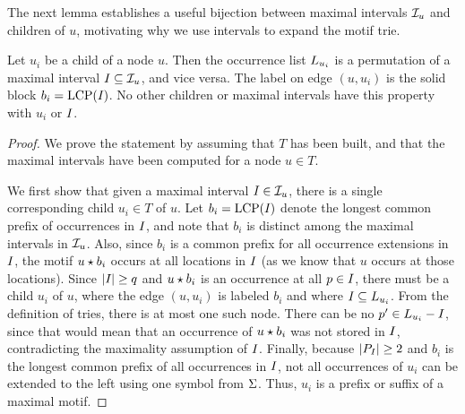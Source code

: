 The next lemma establishes a useful bijection between maximal intervals $\mathcal{I}_{u}$ and children of $u$, motivating why we use intervals to expand the motif trie. 
\begin{lemma}
  \label{lem:bijection}
    Let $u_i$ be a child of a node $u$. Then the occurrence list $L_{u_i}$ is a permutation of a maximal interval $I_{} \subseteq \mathcal{I}_{u}$, and vice versa. The label on edge $(u, u_i)$ is the solid block $b_i = \operatorname{LCP}(I_{})$. No other children or maximal intervals have this property with $u_i$ or $I_{}$.
\end{lemma}
\begin{proof}
    We prove the statement by assuming that $T$ has been built, and that the maximal intervals have been computed for a node $u \in T$.

    We first show that given a maximal interval $I_{} \in \mathcal{I}_{u}$, there is a single corresponding child $u_i \in T$ of $u$.
    Let $b_i = \operatorname{LCP}(I_{})$ denote the longest common prefix of occurrences in $I_{}$, and note that $b_i$ is distinct among the maximal intervals in $\mathcal{I}_{u}$. Also, since $b_i$ is a common prefix for all occurrence extensions in $I_{}$, the motif $u \star b_i$ occurs at all locations in $I_{}$ (as we know that $u$ occurs at those locations). 
    Since $|I_{}| \geq q$ and $u \star b_i$ is an occurrence at all $p \in I_{}$, there must be a child $u_i$ of $u$, where the edge $(u, u_i)$ is labeled $b_i$ and where $I_{} \subseteq L_{u_i}$. From the definition of tries, there is at most one such node. There can be no $p' \in L_{u_i} - I_{}$, since that would mean that an occurrence of $u \star b_i$ was not stored in $I_{}$, contradicting the maximality assumption of $I_{}$. Finally, because $|P_{I_{}}| \geq 2$ and $b_i$ is the longest common prefix of all occurrences in $I_{}$, not all occurrences of $u_i$ can be extended to the left using one symbol from $\Sigma$. Thus, $u_i$ is a prefix or suffix of a maximal motif.
    

\end{proof}
